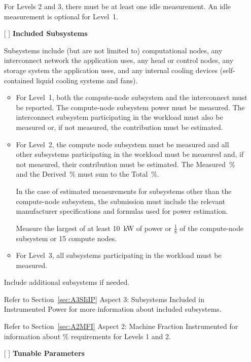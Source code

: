 \begin{itemize}
For Levels 2 and 3, there must be at least one idle measurement. An idle measurement is optional for Level~1. 

\newpage
\item[{[ ]}]
\textbf{Included Subsystems}

Subsystems include (but are not limited to) computational nodes, any interconnect network the application uses, any head or control nodes, any storage system the application uses, and any internal cooling devices (self-contained liquid cooling systems and fans).  

\begin{itemize}
\item
For Level~1, both the compute-node subsystem and the interconnect must be reported.  
The compute-node subsystem power must be measured. 
The interconnect subsystem participating in the workload must also be measured or, if not measured, the contribution must be estimated.


\item
For Level~2, the compute node subsystem must be measured and all other subsystems participating in the workload must be measured and, if not measured, their contribution must be estimated. The Measured~\% and the Derived~\% must sum to the Total~\%.

In the case of estimated measurements for subsystems other than 
the compute-node subsystem, the submission must include the relevant 
manufacturer specifications and formulas used for power estimation. 

Measure the largest of at least 10~kW of power or $ \frac{1}{8} $ of the compute-node subsystem or 15 compute nodes.

\item
For Level~3, all subsystems participating in the workload must be measured.
\end{itemize}

Include additional subsystems if needed.

Refer to Section~\ref{sec:A3SIiIP} Aspect 3: Subsystems Included in Instrumented Power for more information about included subsystems.

Refer to Section~\ref{sec:A2MFI} Aspect 2: Machine Fraction Instrumented for information about \% requirements for Levels 1 and 2.
 
\item[{[ ]}]
\textbf{Tunable Parameters}


\end{itemize}

